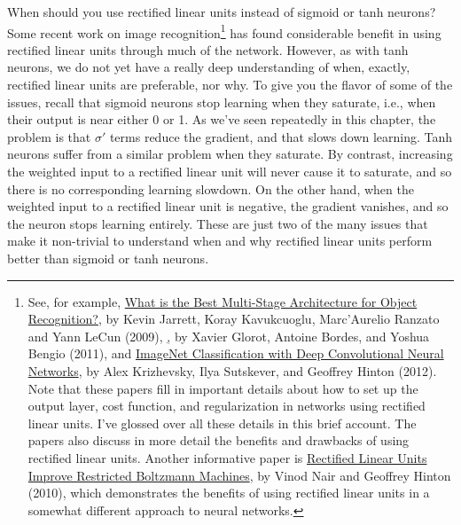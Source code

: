 \documentclass[a4paper,twoside,10pt]{book}
\begin{document}
When should you use rectified linear units instead of sigmoid or tanh neurons? Some recent work on image recognition\footnote{See, for example, \href{http://yann.lecun.com/exdb/publis/pdf/jarrett-iccv-09.pdf}{What is the Best Multi-Stage Architecture for Object Recognition?}, by Kevin Jarrett, Koray Kavukcuoglu, Marc'Aurelio Ranzato and Yann LeCun (2009), \href{Deep Sparse Rectiﬁer Neural Networks}, by Xavier Glorot, Antoine Bordes, and Yoshua Bengio (2011), and \href{https://papers.nips.cc/paper/4824-imagenet-classification-with-deep-convolutional-neural-networks.pdf}{ImageNet Classification with Deep Convolutional Neural Networks}, by Alex Krizhevsky, Ilya Sutskever, and Geoffrey Hinton (2012). Note that these papers fill in important details about how to set up the output layer, cost function, and regularization in networks using rectified linear units. I've glossed over all these details in this brief account. The papers also discuss in more detail the benefits and drawbacks of using rectified linear units. Another informative paper is \href{https://www.cs.toronto.edu/~hinton/absps/reluICML.pdf}{Rectified Linear Units Improve Restricted Boltzmann Machines}, by Vinod Nair and Geoffrey Hinton (2010), which demonstrates the benefits of using rectified linear units in a somewhat different approach to neural networks.} has found considerable benefit in using rectified linear units through much of the network. However, as with tanh neurons, we do not yet have a really deep understanding of when, exactly, rectified linear units are preferable, nor why. To give you the flavor of some of the issues, recall that sigmoid neurons stop learning when they saturate, i.e., when their output is near either 0 or 1. As we've seen repeatedly in this chapter, the problem is that $\sigma'$ terms reduce the gradient, and that slows down learning. Tanh neurons suffer from a similar problem when they saturate. By contrast, increasing the weighted input to a rectified linear unit will never cause it to saturate, and so there is no corresponding learning slowdown. On the other hand, when the weighted input to a rectified linear unit is negative, the gradient vanishes, and so the neuron stops learning entirely. These are just two of the many issues that make it non-trivial to understand when and why rectified linear units perform better than sigmoid or tanh neurons.
\end{document}
